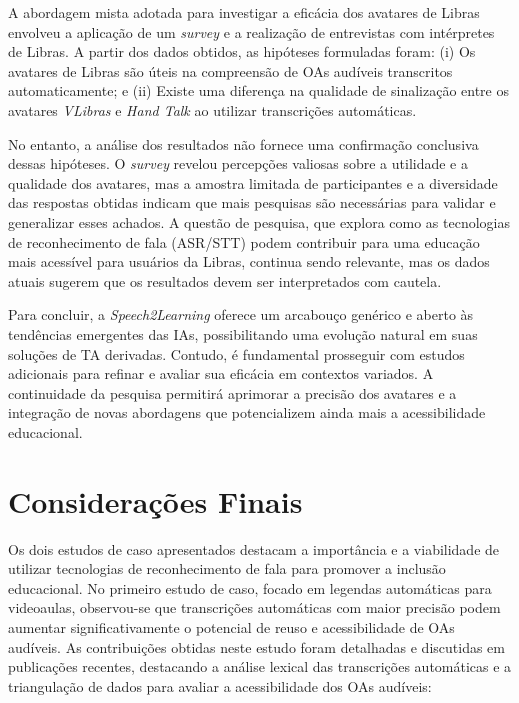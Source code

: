 A abordagem mista adotada para investigar a eficácia dos avatares de Libras envolveu a aplicação de um \textit{survey} e a realização de entrevistas com intérpretes de Libras. A partir dos dados obtidos, as hipóteses formuladas foram: (i) Os avatares de Libras são úteis na compreensão de OAs audíveis transcritos automaticamente; e (ii) Existe uma diferença na qualidade de sinalização entre os avatares \textit{VLibras} e \textit{Hand Talk} ao utilizar transcrições automáticas.

No entanto, a análise dos resultados não fornece uma confirmação conclusiva dessas hipóteses. O \textit{survey} revelou percepções valiosas sobre a utilidade e a qualidade dos avatares, mas a amostra limitada de participantes e a diversidade das respostas obtidas indicam que mais pesquisas são necessárias para validar e generalizar esses achados. A questão de pesquisa, que explora como as tecnologias de reconhecimento de fala (ASR/STT) podem contribuir para uma educação mais acessível para usuários da Libras, continua sendo relevante, mas os dados atuais sugerem que os resultados devem ser interpretados com cautela.

Para concluir, a \textit{Speech2Learning} oferece um arcabouço genérico e aberto às tendências emergentes das IAs, possibilitando uma evolução natural em suas soluções de TA derivadas. Contudo, é fundamental prosseguir com estudos adicionais para refinar e avaliar sua eficácia em contextos variados. A continuidade da pesquisa permitirá aprimorar a precisão dos avatares e a integração de novas abordagens que potencializem ainda mais a acessibilidade educacional.

\section{Considerações Finais}

Os dois estudos de caso apresentados destacam a importância e a viabilidade de utilizar tecnologias de reconhecimento de fala para promover a inclusão educacional. No primeiro estudo de caso, focado em legendas automáticas para videoaulas, observou-se que transcrições automáticas com maior precisão podem aumentar significativamente o potencial de reuso e acessibilidade de OAs audíveis. As contribuições obtidas neste estudo foram detalhadas e discutidas em publicações recentes, destacando a análise lexical das transcrições automáticas e a triangulação de dados para avaliar a acessibilidade dos OAs audíveis:


